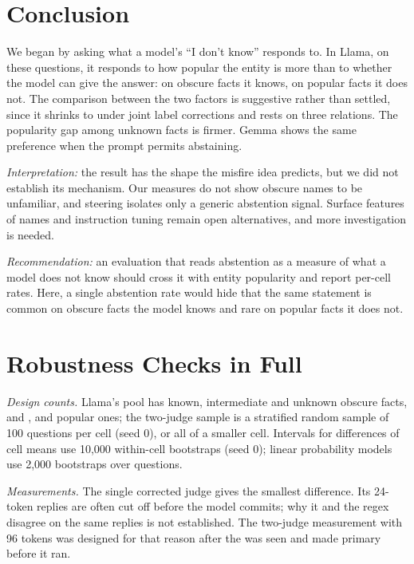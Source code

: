 \documentclass[manuscript,screen,review,anonymous,nonacm]{acmart}
\newcommand{\idk}{``I don't know''}
\begin{document}
\section{Conclusion}

We began by asking what a model's \idk{} responds to. In Llama, on these questions, it responds to how popular the entity is more than to whether the model can give the answer: \tcObsKnownAbs{} on obscure facts it knows, \tcPopUnkAbs{} on popular facts it does not. The comparison between the two factors is suggestive rather than settled, since it shrinks to \rcJoint{} \rcJointCI{} under joint label corrections and rests on three relations. The popularity gap among unknown facts is firmer. Gemma shows the same preference when the prompt permits abstaining.

\emph{Interpretation:} the result has the shape the misfire idea predicts, but we did not establish its mechanism. Our measures do not show obscure names to be unfamiliar, and steering isolates only a generic abstention signal. Surface features of names and instruction tuning remain open alternatives, and more investigation is needed.

\emph{Recommendation:} an evaluation that reads abstention as a measure of what a model does not know should cross it with entity popularity and report per-cell rates. Here, a single abstention rate would hide that the same statement is common on obscure facts the model knows and rare on popular facts it does not.


\appendix

\section{Robustness Checks in Full}
\label{app:robust}

\emph{Design counts.} Llama's pool has \lkObsPoolKnown{} known, \lkObsPoolMaybe{} intermediate and \lkObsPoolUnk{} unknown obscure facts, and \lkPopPoolKnown{}, \lkPopPoolMaybe{} and \lkPopPoolUnk{} popular ones; the two-judge sample is a stratified random sample of 100 questions per cell (seed 0), or all of a smaller cell. Intervals for differences of cell means use 10,000 within-cell bootstraps (seed 0); linear probability models use 2,000 bootstraps over questions.

\emph{Measurements.} The single corrected judge gives the smallest difference. Its 24-token replies are often cut off before the model commits; why it and the regex disagree on the same replies is not established. The two-judge measurement with 96 tokens was designed for that reason after the \hjLlamaDiff{} was seen and made primary before it ran.
\end{document}
